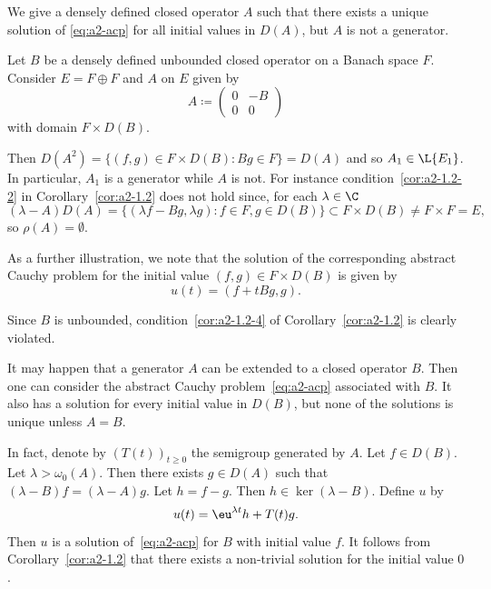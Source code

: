 \begin{example}\label{ex:a2-1.4}
We give a densely defined closed operator $ A $ such that there exists a unique solution of \eqref{eq:a2-acp} for all initial values in $ D(A) $, but $ A $ is not a generator.

Let $ B $ be a densely defined unbounded closed operator on a Banach space $ F $.
Consider $ E = F \oplus F $ and $ A $ on $ E $ given by
\[
    A \coloneqq \begin{pmatrix} 0 & -B \\ 0 & 0 \end{pmatrix}
\]
with domain $ F \times D(B) $.

Then $ D(A^{2}) = \{(f,g) \in F \times D(B) \colon Bg \in F\} = D(A) $ and so $ A_{1} \in \L{E_{1}} $.
In particular, $ A_{1} $ is a generator while
$ A $ is not. For instance
condition~\ref{cor:a2-1.2-2}   in Corollary~\ref{cor:a2-1.2}   does not hold since, for each $ \lambda \in \C $
\[
    (\lambda-A)D(A) = \{(\lambda f-Bg,\lambda g) \colon f \in F, g \in D(B)\} \subset F \times D(B) \neq F \times F = E ,
\]
so $ \rho(A) = \emptyset $.

As a further illustration, we note that the solution of the corresponding abstract Cauchy problem for the initial value $ (f,g) \in F \times D(B) $ is given by 
\[
u(t) = (f + tBg,g) .
\] 

Since $ B $ is unbounded, condition~\ref{cor:a2-1.2-4}  of Corollary~\ref{cor:a2-1.2}  is clearly violated.
\end{example}
\begin{remark*}\label{rem:a2-1.4-kgk} 
It may happen that a generator $A$ can be extended to a closed operator $B$.
Then one can consider the abstract Cauchy problem~\eqref{eq:a2-acp} associated with $B$.
It also has a solution for every initial value in $D(B)$, but none of the solutions is unique unless $A = B$.

In fact, denote by $(T(t))_{t \geq 0}$ the semigroup generated by $A$.
Let $f \in D(B)$.
Let $\lambda > \omega_{0}(A)$.
Then there exists $g \in D(A)$ such that $(\lambda-B)f = (\lambda-A)g$.
Let $h = f - g$.
Then $h \in \ker(\lambda-B)$.
Define $u$ by 
%
\[
	u(t) = \eu^{\lambda t}h + T(t)g .
\]
%
Then $u$ is a solution of~\eqref{eq:a2-acp} for $B$ with initial value $f$.
It follows from Corollary~\ref{cor:a2-1.2} that there exists a non-trivial solution for the initial value $0$.
\end{remark*}

